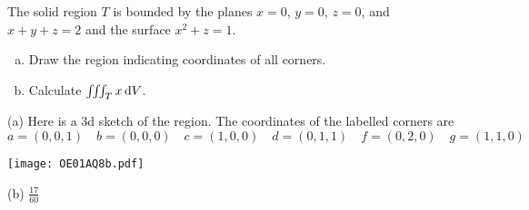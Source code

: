 \goodbreak
\begin{question} [M200 2001A] %
The solid region $T$ is bounded by the planes $x=0$, $y=0$, 
$z=0$, and $x+y+z=2$ and the surface $x^2+z=1$.
\begin{enumerate}[(a)]
\item
Draw the region indicating coordinates of all corners.

\item
Calculate $\iiint_T x\,\mathrm{d}V$.
\end{enumerate}
\end{question}

%

\begin{answer}
(a)
Here is a 3d sketch of the region. The coordinates of the labelled corners are
\begin{equation*}
a=(0,0,1)\quad
b=(0,0,0)\quad
c=(1,0,0)\quad
d=(0,1,1)\quad
f=(0,2,0)\quad
g=(1,1,0)
\end{equation*}
\begin{center}
     \texttt{[image: OE01AQ8b.pdf]}
\end{center}


(b) $\frac{17}{60}$
\end{answer}

